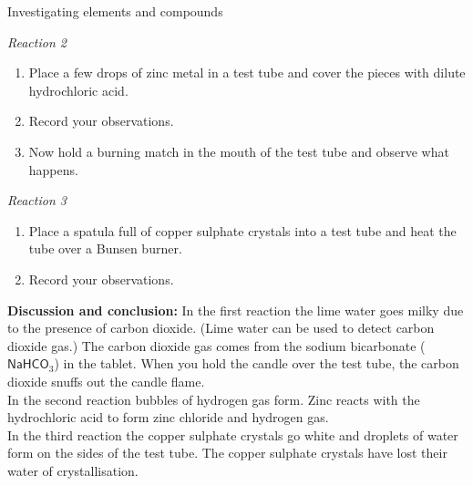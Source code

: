 \begin{g_experiment}{Investigating elements and compounds}
\begin{enumerate}[label=\textbf{\arabic*}.]
\end{enumerate}
\textsl{Reaction 2}
\begin{enumerate}[label=\textbf{\arabic*}.]
\item Place a few drops of zinc metal in a test tube and cover the pieces with dilute hydrochloric acid.
\item Record your observations.
\item Now hold a burning match in the mouth of the test tube and observe what happens.
\end{enumerate}
\textsl{Reaction 3}
\begin{enumerate}[label=\textbf{\arabic*}.]
\item Place a spatula full of copper sulphate crystals into a test tube and heat the tube over a Bunsen burner.
\item Record your observations.
\end{enumerate}
\textbf{Discussion and conclusion: } In the first reaction the lime water goes milky due to the presence of carbon dioxide. (Lime water can be used to detect carbon dioxide gas.) The carbon dioxide gas comes from the sodium bicarbonate ($\textsf{NaHCO}_3$) in the tablet. When you hold the candle over the test tube, the carbon dioxide snuffs out the candle flame. \\
In the second reaction bubbles of hydrogen gas form. Zinc reacts with the hydrochloric acid to form zinc chloride and hydrogen gas. \\
In the third reaction the copper sulphate crystals go white and droplets of water form on the sides of the test tube. The copper sulphate crystals have lost their water of crystallisation. 
\end{g_experiment}
{}
